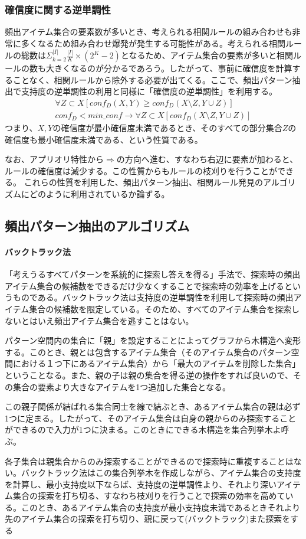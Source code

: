 \documentclass[dvipdfmx]{jsarticle}
\begin{document}
\subsubsection{確信度に関する逆単調性}
頻出アイテム集合の要素数が多いとき、考えられる相関ルールの組み合わせも非常に多くなるため組み合わせ爆発が発生する可能性がある。考えられる相関ルールの総数は$\Sigma_{k=2}^{|I|}\frac{|I|}{K}\times (2^{K}-2)$となるため、アイテム集合の要素が多いと相関ルールの数も大きくなるのが分かるであろう。したがって、事前に確信度を計算することなく、相関ルールから除外する必要が出てくる。ここで、頻出パターン抽出で支持度の逆単調性の利用と同様に「確信度の逆単調性」を利用する。
\begin{gather*}
  \forall Z \subset X[ conf_{D}(X, Y) \geq conf_{D}(X \setminus Z, Y \cup Z)] \\
  conf_{D} < min\_conf \rightarrow \forall Z \subset X[conf_{D}(X \setminus Z, Y \cup Z)]
\end{gather*}
つまり、$X, Y$の確信度が最小確信度未満であるとき、そのすべての部分集合$Z$の確信度も最小確信度未満である、という性質である。\par
なお、アプリオリ特性から$\Rightarrow$の方向へ進む、すなわち右辺に要素が加わると、ルールの確信度は減少する。この性質からもルールの枝刈りを行うことができる。
これらの性質を利用した、頻出パターン抽出、相関ルール発見のアルゴリズムにどのように利用されているか論ずる。
\subsection{頻出パターン抽出のアルゴリズム}
\paragraph{バックトラック法}
「考えうるすべてパターンを系統的に探索し答えを得る」手法で、探索時の頻出アイテム集合の候補数をできるだけ少なくすることで探索時の効率を上げるというものである。バックトラック法は支持度の逆単調性を利用して探索時の頻出アイテム集合の候補数を限定している。そのため、すべてのアイテム集合を探索しないとはいえ頻出アイテム集合を逃すことはない。\par
パターン空間内の集合に「親」を設定することによってグラフから木構造へ変形する。このとき、親とは包含するアイテム集合（そのアイテム集合のパターン空間における１つ下にあるアイテム集合）から「最大のアイテムを削除した集合」ということなる。また、親の子は親の集合を得る逆の操作をすれば良いので、その集合の要素より大きなアイテムを1つ追加した集合となる。\par
この親子関係が結ばれる集合同士を線で結ぶとき、あるアイテム集合の親は必ず1つに定まる。したがって、そのアイテム集合は自身の親からのみ探索することができるので入力が1つに決まる。このときにできる木構造を集合列挙木よ呼ぶ。\par
各子集合は親集合からのみ探索することができるので探索時に重複することはない。バックトラック法はこの集合列挙木を作成しながら、アイテム集合の支持度を計算し、最小支持度以下ならば、支持度の逆単調性より、それより深いアイテム集合の探索を打ち切る、すなわち枝刈りを行うことで探索の効率を高めている。このとき、あるアイテム集合の支持度が最小支持度未満であるときそれより先のアイテム集合の探索を打ち切り、親に戻って(バックトラック)また探索をする
\end{document}
